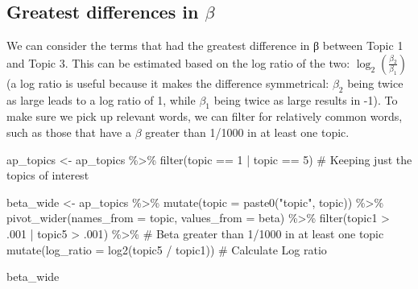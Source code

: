 \documentclass[
  letterpaper,
  DIV=11,
  numbers=noendperiod]{scrreprt}
\newenvironment{Shaded}{\begin{snugshade}}{\end{snugshade}}
\newcommand{\AttributeTok}[1]{\textcolor[rgb]{0.40,0.45,0.13}{#1}}
\newcommand{\CommentTok}[1]{\textcolor[rgb]{0.37,0.37,0.37}{#1}}
\newcommand{\DecValTok}[1]{\textcolor[rgb]{0.68,0.00,0.00}{#1}}
\newcommand{\FunctionTok}[1]{\textcolor[rgb]{0.28,0.35,0.67}{#1}}
\newcommand{\NormalTok}[1]{\textcolor[rgb]{0.00,0.23,0.31}{#1}}
\newcommand{\OtherTok}[1]{\textcolor[rgb]{0.00,0.23,0.31}{#1}}
\newcommand{\SpecialCharTok}[1]{\textcolor[rgb]{0.37,0.37,0.37}{#1}}
\newcommand{\StringTok}[1]{\textcolor[rgb]{0.13,0.47,0.30}{#1}}
\begin{document}
\hypertarget{greatest-differences-in-beta}{%
\subsection{\texorpdfstring{Greatest differences in
\(\beta\)}{Greatest differences in \textbackslash beta}}\label{greatest-differences-in-beta}}

We can consider the terms that had the greatest difference in β between
Topic 1 and Topic 3. This can be estimated based on the log ratio of the
two: \(\log_2(\frac{\beta_2}{\beta_1})\) (a log ratio is useful because
it makes the difference symmetrical: \(\beta_2\) being twice as large
leads to a log ratio of 1, while \(\beta_1\) being twice as large
results in -1). To make sure we pick up relevant words, we can filter
for relatively common words, such as those that have a \(\beta\) greater
than 1/1000 in at least one topic.

\begin{Shaded}
\begin{Highlighting}[]
\NormalTok{ap\_topics }\OtherTok{\textless{}{-}}\NormalTok{ ap\_topics }\SpecialCharTok{\%\textgreater{}\%}
  \FunctionTok{filter}\NormalTok{(topic }\SpecialCharTok{==} \DecValTok{1} \SpecialCharTok{|}\NormalTok{ topic }\SpecialCharTok{==} \DecValTok{5}\NormalTok{) }\CommentTok{\# Keeping just the topics of interest}

\NormalTok{beta\_wide }\OtherTok{\textless{}{-}}\NormalTok{ ap\_topics }\SpecialCharTok{\%\textgreater{}\%}
  \FunctionTok{mutate}\NormalTok{(}\AttributeTok{topic =} \FunctionTok{paste0}\NormalTok{(}\StringTok{"topic"}\NormalTok{, topic)) }\SpecialCharTok{\%\textgreater{}\%}
  \FunctionTok{pivot\_wider}\NormalTok{(}\AttributeTok{names\_from =}\NormalTok{ topic, }\AttributeTok{values\_from =}\NormalTok{ beta) }\SpecialCharTok{\%\textgreater{}\%} 
  \FunctionTok{filter}\NormalTok{(topic1 }\SpecialCharTok{\textgreater{}}\NormalTok{ .}\DecValTok{001} \SpecialCharTok{|}\NormalTok{ topic5 }\SpecialCharTok{\textgreater{}}\NormalTok{ .}\DecValTok{001}\NormalTok{) }\SpecialCharTok{\%\textgreater{}\%} \CommentTok{\# Beta greater than 1/1000 in at least one topic}
  \FunctionTok{mutate}\NormalTok{(}\AttributeTok{log\_ratio =} \FunctionTok{log2}\NormalTok{(topic5 }\SpecialCharTok{/}\NormalTok{ topic1)) }\CommentTok{\# Calculate Log ratio}

\NormalTok{beta\_wide}
\end{Highlighting}
\end{Shaded}
\end{document}
